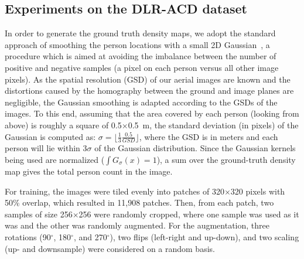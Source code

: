 \documentclass{bmvc2k}
\newcommand{\x}{$\times$}
\begin{document}
\subsection{Experiments on the DLR-ACD dataset}
In order to generate the ground truth density maps, we adopt the standard approach of smoothing the person locations with a small 2D Gaussian~\cite{Zhang2016}, a procedure which is aimed at avoiding the imbalance between the number of positive and negative samples (a pixel on each person versus all other image pixels). 
As the spatial resolution (GSD) of our aerial images are known and the distortions caused by the homography between the ground and image planes are negligible, the Gaussian smoothing is adapted according to the GSDs of the images. To this end, assuming that the area covered by each person (looking from above) is roughly a square of 0.5\x0.5~m, the standard deviation (in pixels) of the Gaussian is computed as: $\sigma=\lfloor\frac{1}{3}\frac{0.5}{GSD}\rfloor$, where the GSD is in meters and each person will lie within 3$\sigma$ of the Gaussian distribution. Since the Gaussian kernels being used are normalized ($\int G_\sigma(x)=1$), a sum over the ground-truth density map gives the total person count in the image.

For training, the images were tiled evenly into patches of 320\x320 pixels with 50\% overlap, which resulted in 11,908 patches. Then, from each patch, two samples of size 256\x256 were randomly cropped, where one sample was used as it was and the other was randomly augmented. For the augmentation, three rotations (90$^{\circ}$, 180$^{\circ}$, and 270$^{\circ}$), two flips (left-right and up-down), and two scaling (up- and downsample) were considered on a random basis.
\end{document}

